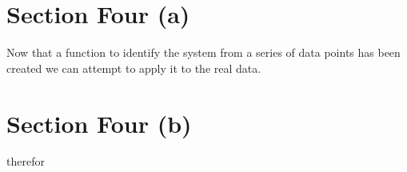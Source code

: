 \section*{Section Four (a)}

Now that a function to identify the system from a series of data points has been
created we can attempt to apply it to the real data.  


\section*{Section Four (b)}

therefor 

